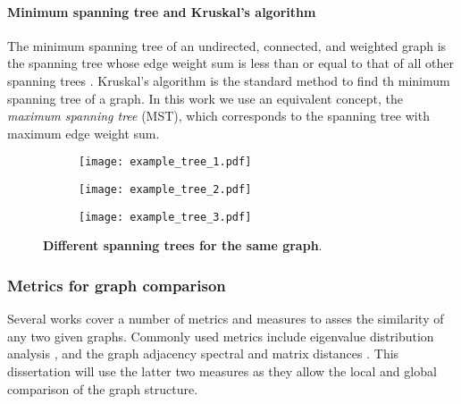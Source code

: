 \paragraph*{Minimum spanning tree and Kruskal's algorithm}
The minimum spanning tree of an undirected, connected, and weighted graph is the spanning tree whose edge weight sum is less than or equal to that of all other spanning trees \cite{Sefidgarminimumspanningtree}. Kruskal's algorithm \cite{Kershenbaum1972Computingminimumspanning} is the standard method to find th minimum spanning tree of a graph. In this work we use an equivalent concept, the \emph{maximum spanning tree} (MST), which corresponds to the spanning tree with maximum edge weight sum.
\begin{figure*}[!t]
	\centering	
	\hspace*{\fill}
	\begin{subfigure}[t]{0.32\textwidth}
		\subcaption{}
		\texttt{[image: example\_tree\_1.pdf]}
		\label{fig:example_tree_1}
	\end{subfigure}	
	\hfill
	\begin{subfigure}[t]{0.32\textwidth}
		\subcaption{}
		\texttt{[image: example\_tree\_2.pdf]}
		\label{fig:example_tree_2}
	\end{subfigure}
	\hfill
	\begin{subfigure}[t]{0.32\textwidth}
		\subcaption{}
		\texttt{[image: example\_tree\_3.pdf]}
		\label{fig:example_tree_3}
	\end{subfigure}	
	\hspace*{\fill}	
	\caption[] {\label{fig:tree_examples} \textbf{Different spanning trees for the same graph}.}
\end{figure*}

\subsubsection{Metrics for graph comparison}
Several works cover a number of metrics and measures to asses the similarity of any two given graphs. Commonly used metrics include eigenvalue distribution analysis \cite{Crawford2017GraphStructureSimilarity,Gera2018Identifyingnetworkstructure}, and the graph adjacency spectral and matrix distances \cite{Wills2020Metricsgraphcomparison}. This dissertation will use the latter two measures as they allow the local and global comparison of the graph structure.

